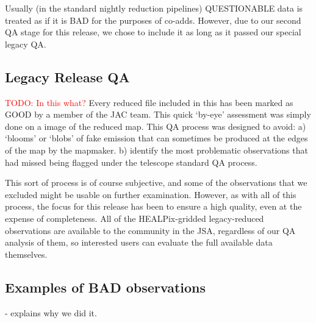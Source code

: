 \documentclass[twocolumn]{aastex6}
\newcommand{\todo}[1]{\textcolor{red}{TODO: #1}}
\newcommand{\status}[1]{\textsf{#1}}
\begin{document}
Usually (in the standard nightly reduction pipelines)
\status{QUESTIONABLE} data is treated as if it is \status{BAD} for the
purposes of co-adds. However, due to our second QA stage for this
release, we chose to include it as long as it passed our special
legacy QA.

\subsection{Legacy Release QA}

\todo{In this what?}
Every reduced file included in this has been marked as \status{GOOD}
by a member of the JAC team. This quick `by-eye' assessment was simply
done on a image of the reduced map. This QA process was designed to
avoid: a) `blooms' or `blobs' of fake emission that can sometimes be
produced at the edges of the map by the mapmaker.  b) identify the
most problematic observations that had missed being flagged under the
telescope standard QA process.

This sort of process is of course subjective, and some of the
observations that we excluded might be usable on further
examination. However, as with all of this process, the focus for this
release has been to ensure a high quality, even at the expense
of completeness. All of the HEALPix-gridded legacy-reduced
observations are available to the community in the JSA, regardless of
our QA analysis of them, so interested users can evaluate the full
available data themselves.

%
\subsection{Examples of BAD observations}
- explains why we did it.
\end{document}
